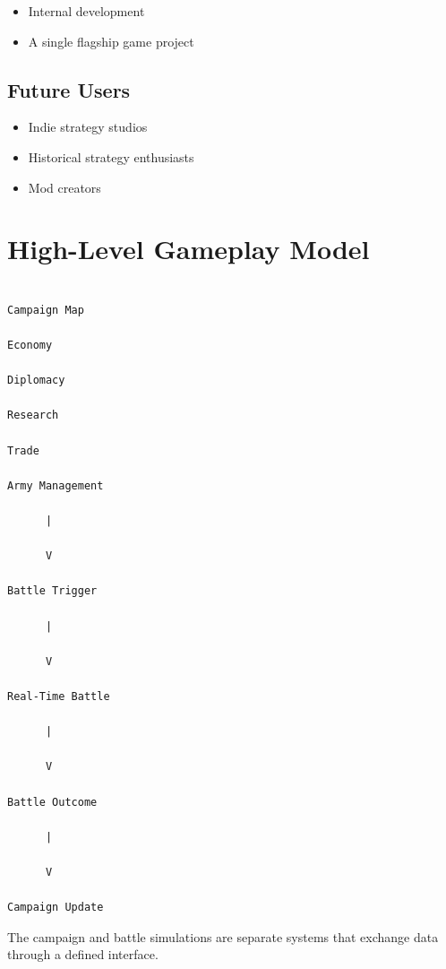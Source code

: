 \documentclass[11pt,a4paper]{article}
\begin{document}
\begin{itemize}

    \item Internal development

    \item A single flagship game project

\end{itemize}

\subsection{Future Users}

\begin{itemize}

    \item Indie strategy studios

    \item Historical strategy enthusiasts

    \item Mod creators

\end{itemize}

\section{High-Level Gameplay Model}

\begin{verbatim}

Campaign Map

Economy

Diplomacy

Research

Trade

Army Management

      |

      V

Battle Trigger

      |

      V

Real-Time Battle

      |

      V

Battle Outcome

      |

      V

Campaign Update

\end{verbatim}

The campaign and battle simulations are separate systems that exchange data through a defined interface.
\end{document}
